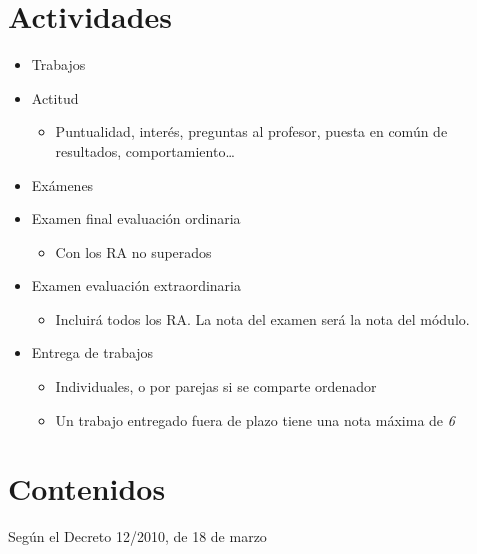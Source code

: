 \documentclass[a4paper]{article}
\begin{document}
\section{Actividades}
\label{sec:org0000015}
\begin{itemize}
\item Trabajos
\item Actitud
\begin{itemize}
\item Puntualidad, interés, preguntas al profesor, puesta en común de resultados, comportamiento\ldots{}
\end{itemize}
\item Exámenes
\item Examen final evaluación ordinaria
\begin{itemize}
\item Con los RA no superados
\end{itemize}
\item Examen evaluación extraordinaria
\begin{itemize}
\item Incluirá todos los RA. La nota del examen será la nota del módulo.
\end{itemize}
\item Entrega de trabajos
\begin{itemize}
\item Individuales, o por parejas si se comparte ordenador
\item Un trabajo entregado fuera de plazo tiene una nota máxima de \emph{6}
\end{itemize}
\end{itemize}



\section{Contenidos}
\label{sec:org0000018}

Según el Decreto 12/2010, de 18 de marzo
\end{document}

